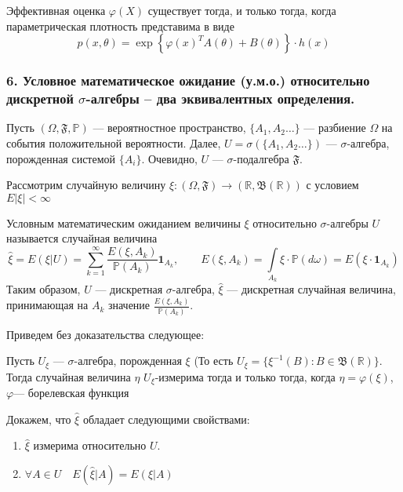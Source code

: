 \documentclass[12pt, russian]{article}
\begin{document}
\noindent Эффективная оценка $\varphi(X)$ существует тогда, и только тогда, когда параметрическая плотность представима в виде
$$ p(x, \theta) = \exp{\left\{ \varphi(x)^T A(\theta) + B(\theta) \right\}} \cdot h(x)$$

\newpage
\subsubsection*{6. Условное математическое ожидание (у.м.о.) относительно дискретной $\sigma$-алгебры – два эквивалентных определения.}

Пусть $(\Omega, \mathfrak{F}, \mathbb{P})$ --- вероятностное пространство, $\{A_1, A_2 \ldots \}$ --- разбиение $\Omega$ на события положительной вероятности. 
Далее, $U = \sigma(\{A_1, A_2 \ldots \})$ --- $\sigma$-алгебра, порожденная системой $\{A_i\}$. Очевидно, $U$ --- $\sigma$-подалгебра $\mathfrak{F}$.

\noindent Рассмотрим случайную величину $\xi:(\Omega, \mathfrak{F}) \rightarrow (\mathbb{R}, \mathfrak{B}(\mathbb{R}))$ с условием $E|\xi| < \infty$

\begin{mydef}
Условным математическим ожиданием величины $\xi$ относительно $\sigma$-алгебры $U$ называется случайная величина 
$$ \hat{\xi} = E(\xi|U) = \sum\limits_{k=1}^{\infty}{\frac{E(\xi, A_k)}{\mathbb{P}(A_k)}\mathbf{1}_{A_k}}, \qquad E(\xi, A_k) = \int\limits_{A_k}{\xi\cdot \mathbb{P}(d\omega)} = E(\xi\cdot\mathbf{1}_{A_k})$$
Таким образом, $U$ --- дискретная $\sigma$-алгебра, $\hat{\xi}$ --- дискретная случайная величина, принимающая на $A_k$ значение $\frac{E(\xi, A_k)}{\mathbb{P}(A_k)}$. 
\end{mydef}

\noindent Приведем без доказательства следующее:
\begin{lemma}
Пусть $U_\xi$ --- $\sigma$-алгебра, порожденная $\xi$ (То есть $U_\xi = \{\xi^{-1}(B):B\in\mathfrak{B}(\mathbb{R}) \}$. Тогда случайная величина $\eta$ $U_\xi$-измерима тогда и только тогда, когда $\eta = \varphi(\xi)$, $\varphi$--- борелевская функция 
\end{lemma}

\noindent Докажем, что $\hat{\xi}$ обладает следующими свойствами:
\begin{enumerate}
\item $\hat{\xi}$ измерима относительно $U$.
\item $\forall A\in U\quad E(\hat{\xi}|A) = E(\xi|A)$
\end{enumerate}
\end{document}
